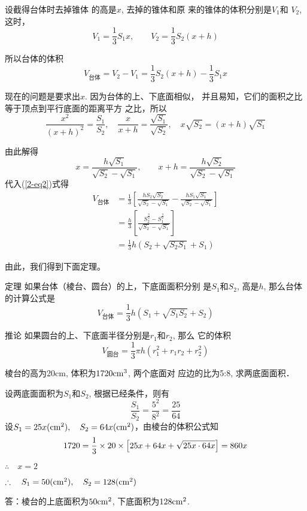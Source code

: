 设截得台体时去掉锥体
的高是$x$, 去掉的锥体和原
来的锥体的体积分别是$V_1$和
$V_2$, 这时，
\[V_1=\frac{1}{3}S_1 x,\qquad V_2=\frac{1}{3}S_2(x+h)\]

所以台体的体积
\begin{equation}\label{2-eq2}
    V_{\text{台体}}=V_2-V_1=\frac{1}{3}S_2(x+h)-\frac{1}{3}S_1x
\end{equation}

现在的问题是要求出$x$. 因为台体的上、下底面相似，
并且易知，它们的面积之比等于顶点到平行底面的距离平方
之比，所以
\[\frac{x^2}{(x+h)^2}=\frac{S_1}{S_2},\quad \frac{x}{x+h}=\frac{\sqrt{S_1}}{\sqrt{S_2}},\quad x\sqrt{S_2}=(x+h)\sqrt{S_1}\]

由此解得
\[x=\frac{h\sqrt{S_1}}{\sqrt{S_2}-\sqrt{S_1}},\qquad x+h=\frac{h\sqrt{S_2}}{\sqrt{S_2}-\sqrt{S_1}}\]
代入(\ref{2-eq2})式得
\[\begin{split}
    V_{\text{台体}}&=\frac{1}{3}\left[\frac{hS_2\sqrt{S_2}}{\sqrt{S_2}-\sqrt{S_1}}-\frac{hS_1\sqrt{S_1}}{\sqrt{S_2}-\sqrt{S_1}}\right]\\
    &=\frac{h}{3}\left[\frac{S_2^{\tfrac{3}{2}}-S_1^{\tfrac{3}{2}}}{\sqrt{S_2}-\sqrt{S_1}}\right]\\
    &=\frac{1}{3}h\left(S_2+\sqrt{S_2S_1}+S_1\right)
\end{split}\]

由此，我们得到下面定理。

\begin{blk}
{定理} 如果台体（棱台、圆台）的上，下底面面积分别
是$S_1$和$S_2$, 高是$h$, 那么台体的计算公式是
\[V_{\text{台体}}=\frac{1}{3}h\left(S_1+\sqrt{S_1S_2}+S_2\right)\]    
\end{blk}

\begin{blk}
{推论} 如果圆台的上、下底面半径分别是$r_1$和$r_2$, 那么
它的体积 
\[V_{\text{圆台}}=\frac{1}{3}\pi h(r^2_1+r_1r_2+r^2_2)\] 
\end{blk}

\begin{example}
    棱台的高为20cm, 体积为$1720{\rm cm^3}$, 两个底面对
    应边的比为5:8, 求两底面面积．
\end{example}

\begin{solution}
    设两底面面积为$S_1$和$S_2$, 根据已经条件，则有
\[\frac{S_1}{S_2}=\frac{5^2}{8^2}=\frac{25}{64}\]   
    设$S_1=25x({\rm cm^2}),\quad S_2=64x({\rm cm^2})$，由棱台的体积公式知
\[    1720=\dfrac{1}{3}\times 20\times \left[25x+64x+\sqrt{25x\cdot 64x}\right]=860x\]

$\therefore\quad x=2$

$\therefore\quad S_1=50({\rm cm^2}),\quad S_2=128({\rm cm^2})$

答：棱台的上底面积为$50{\rm cm^2}$, 下底面积为$128{\rm cm^2}$.
\end{solution}

